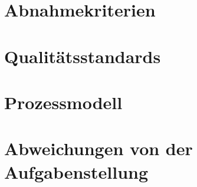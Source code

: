 \section{Abnahmekriterien}


\section{Qualitätsstandards}


\section{Prozessmodell}


\section[Abweichungen]{Abweichungen von der Aufgabenstellung}
